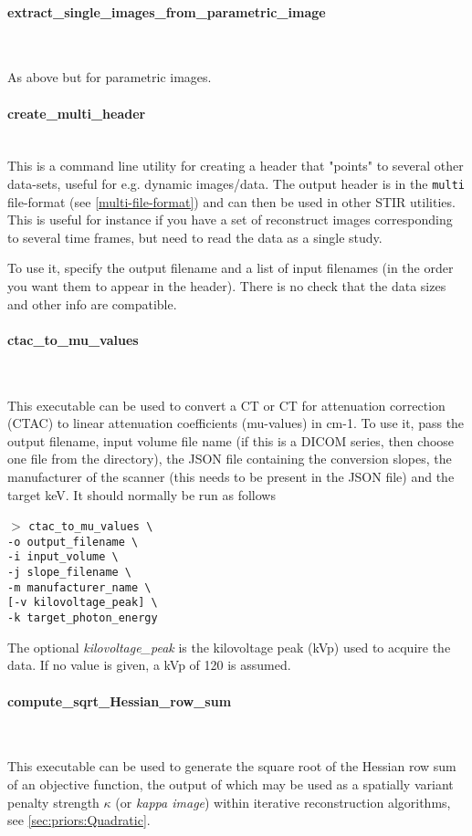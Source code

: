 \documentclass{article}
\newcommand{\subsubsubsection}[1]{\paragraph{#1}\mbox{} \\}
\newcommand{\cmdline}[1]{\par \noindent $>$ \texttt{#1}\par}
\begin{document}
{ {\subsubsubsection{extract\_single\_images\_from\_parametric\_image}
}

As above but for parametric images.

{ \subsubsubsection{create\_multi\_header}
  This is a command line utility for creating a header that "points" to several other
  data-sets, useful for e.g. dynamic images/data. The output header is in the \texttt{multi}
  file-format (see \ref{multi-file-format}) and can then be used in
  other STIR utilities. This is useful for instance if you have
  a set of reconstruct images corresponding to several time frames, but need to read the data
  as a single study.

  To use it, specify the output filename and a list of input filenames (in the order you want
  them to appear in the header).
  There is no check that the data sizes and other info are compatible.

{ \subsubsubsection{ctac\_to\_mu\_values}
}

This executable can be used to convert a CT or CT for attenuation correction (CTAC) to linear attenuation coefficients
(mu-values) in cm-1. To use it, pass the output filename, input volume file name (if this is a DICOM series, then
choose one file from the directory), the JSON file containing the conversion slopes, the manufacturer of the scanner
(this needs to be present in the JSON file) and the target keV. It should normally be run as follows

\cmdline{ctac\_to\_mu\_values {\textbackslash}\\
-o output\_filename {\textbackslash}\\
-i input\_volume {\textbackslash}\\
-j slope\_filename {\textbackslash}\\
-m manufacturer\_name {\textbackslash}\\
{[}-v kilovoltage\_peak{]} {\textbackslash}\\
-k target\_photon\_energy}

The optional \textit{kilovoltage\_peak} is the kilovoltage peak (kVp) used to acquire the data. If no value is given,
a kVp of 120 is assumed. 

{ \subsubsubsection{compute\_sqrt\_Hessian\_row\_sum} \label{sec:Utilities:HessianRowSum}
}
This executable can be used to generate the square root of the Hessian row sum of an objective function, the output of
which may be used as a spatially variant penalty strength $\kappa$ (or \textit{kappa image}) within iterative
reconstruction algorithms, see \ref{sec:priors:Quadratic}.

}}
\end{document}
